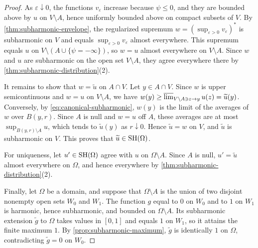 \begin{proof}
As $\varepsilon\downarrow0$, the functions $v_\varepsilon$ increase because $\psi\leq0$, and they are bounded above by $u$ on $V\setminus A$, hence uniformly bounded above on compact subsets of $V$. By \cref{thm:subharmonic-envelope}, the regularized supremum $w=(\sup_{\varepsilon>0}v_\varepsilon)^*$ is subharmonic on $V$ and equals $\sup_{\varepsilon>0}v_\varepsilon$ almost everywhere. This supremum equals $u$ on $V\setminus(A\cup\{\psi=-\infty\})$, so $w=u$ almost everywhere on $V\setminus A$. Since $w$ and $u$ are subharmonic on the open set $V\setminus A$, they agree everywhere there by \cref{thm:subharmonic-distribution}(2).

It remains to show that $w=\widetilde u$ on $A\cap V$. Let $y\in A\cap V$. Since $w$ is upper semicontinuous and $w=u$ on $V\setminus A$, we have $w(y)\geq\varlimsup_{V\setminus A\ni z\to y}u(z)=\widetilde u(y)$. Conversely, by \eqref{eq:canonical-subharmonic}, $w(y)$ is the limit of the averages of $w$ over $B(y,r)$. Since $A$ is null and $w=u$ off $A$, these averages are at most $\sup_{B(y,r)\setminus A}u$, which tends to $\widetilde u(y)$ as $r\downarrow0$. Hence $\widetilde u=w$ on $V$, and $\widetilde u$ is subharmonic on $V$. This proves that $\widetilde u\in\mathrm{SH}(\Omega)$.

For uniqueness, let $u'\in\mathrm{SH}(\Omega)$ agree with $u$ on $\Omega\setminus A$. Since $A$ is null, $u'=\widetilde u$ almost everywhere on $\Omega$, and hence everywhere by \cref{thm:subharmonic-distribution}(2).

Finally, let $\Omega$ be a domain, and suppose that $\Omega\setminus A$ is the union of two disjoint nonempty open sets $W_0$ and $W_1$. The function $g$ equal to $0$ on $W_0$ and to $1$ on $W_1$ is harmonic, hence subharmonic, and bounded on $\Omega\setminus A$. Its subharmonic extension $\widetilde g$ to $\Omega$ takes values in $[0,1]$ and equals $1$ on $W_1$, so it attains the finite maximum $1$. By \cref{prop:subharmonic-maximum}, $\widetilde g$ is identically $1$ on $\Omega$, contradicting $\widetilde g=0$ on $W_0$.
\end{proof}
